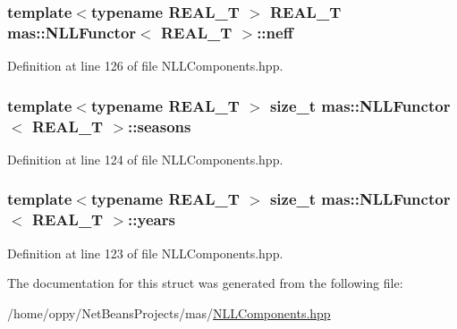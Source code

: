 \hypertarget{structmas_1_1_n_l_l_functor_ac7fe7be14787477c775c1c628a454118}{
\subsubsection[{neff}]{\setlength{\rightskip}{0pt plus 5cm}template$<$typename R\-E\-A\-L\-\_\-\-T $>$ R\-E\-A\-L\-\_\-\-T {\bf mas\-::\-N\-L\-L\-Functor}$<$ R\-E\-A\-L\-\_\-\-T $>$\-::neff}}\label{structmas_1_1_n_l_l_functor_ac7fe7be14787477c775c1c628a454118}


Definition at line 126 of file N\-L\-L\-Components.\-hpp.

\hypertarget{structmas_1_1_n_l_l_functor_ac59c36239b1817b5bb357bf90dc4802d}{
\subsubsection[{seasons}]{\setlength{\rightskip}{0pt plus 5cm}template$<$typename R\-E\-A\-L\-\_\-\-T $>$ size\-\_\-t {\bf mas\-::\-N\-L\-L\-Functor}$<$ R\-E\-A\-L\-\_\-\-T $>$\-::seasons}}\label{structmas_1_1_n_l_l_functor_ac59c36239b1817b5bb357bf90dc4802d}


Definition at line 124 of file N\-L\-L\-Components.\-hpp.

\hypertarget{structmas_1_1_n_l_l_functor_ac76e5d7e0808486b42ffdaea952dd19f}{
\subsubsection[{years}]{\setlength{\rightskip}{0pt plus 5cm}template$<$typename R\-E\-A\-L\-\_\-\-T $>$ size\-\_\-t {\bf mas\-::\-N\-L\-L\-Functor}$<$ R\-E\-A\-L\-\_\-\-T $>$\-::years}}\label{structmas_1_1_n_l_l_functor_ac76e5d7e0808486b42ffdaea952dd19f}


Definition at line 123 of file N\-L\-L\-Components.\-hpp.



The documentation for this struct was generated from the following file\-:\begin{DoxyCompactItemize}
\item 
/home/oppy/\-Net\-Beans\-Projects/mas/\hyperlink{_n_l_l_components_8hpp}{N\-L\-L\-Components.\-hpp}\end{DoxyCompactItemize}
